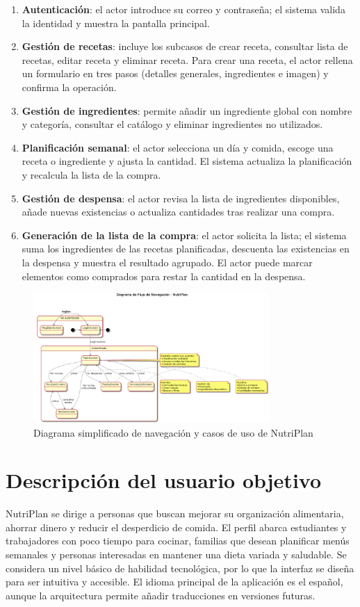 \documentclass[twoside, openright, 11pt]{report}
\begin{document}
\begin{enumerate}
  \item \textbf{Autenticación}: el actor introduce su correo y contraseña; el sistema valida la identidad y muestra la pantalla principal.
  \item \textbf{Gestión de recetas}: incluye los subcasos de crear receta, consultar lista de recetas, editar receta y eliminar receta. Para crear una receta, el actor rellena un formulario en tres pasos (detalles generales, ingredientes e imagen) y confirma la operación.
  \item \textbf{Gestión de ingredientes}: permite añadir un ingrediente global con nombre y categoría, consultar el catálogo y eliminar ingredientes no utilizados.
  \item \textbf{Planificación semanal}: el actor selecciona un día y comida, escoge una receta o ingrediente y ajusta la cantidad. El sistema actualiza la planificación y recalcula la lista de la compra.
  \item \textbf{Gestión de despensa}: el actor revisa la lista de ingredientes disponibles, añade nuevas existencias o actualiza cantidades tras realizar una compra.
  \item \textbf{Generación de la lista de la compra}: el actor solicita la lista; el sistema suma los ingredientes de las recetas planificadas, descuenta las existencias en la despensa y muestra el resultado agrupado. El actor puede marcar elementos como comprados para restar la cantidad en la despensa.
\end{enumerate}

\begin{figure}[H]
  \centering
  \includegraphics[width=0.8\textwidth]{imagenes/navigation_flow.png}
  \caption{Diagrama simplificado de navegación y casos de uso de NutriPlan}
  \label{fig:navigationFlow}
\end{figure}

\section{Descripción del usuario objetivo}
NutriPlan se dirige a personas que buscan mejorar su organización alimentaria, ahorrar dinero y reducir el desperdicio de comida. El perfil abarca estudiantes y trabajadores con poco tiempo para cocinar, familias que desean planificar menús semanales y personas interesadas en mantener una dieta variada y saludable. Se considera un nivel básico de habilidad tecnológica, por lo que la interfaz se diseña para ser intuitiva y accesible. El idioma principal de la aplicación es el español, aunque la arquitectura permite añadir traducciones en versiones futuras.
\end{document}
